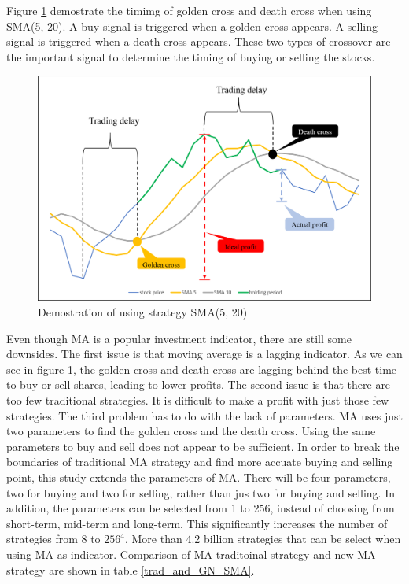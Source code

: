 \documentclass[../main.tex]{subfiles}
\begin{document}
\bigbreak
Figure \ref{cross_demo} demostrate the timimg of golden cross and death cross when using SMA(5, 20). A buy signal is triggered when a golden cross appears. A selling signal is triggered when a death cross appears. These two types of crossover are the important signal to determine the timing of buying or selling the stocks.
\bigbreak

\begin{figure}[ht]
    \centering
    \includegraphics[scale = 0.6] {figure/cross1.png}
    \caption{Demostration of using strategy SMA(5, 20)}
    \label{cross_demo}
\end{figure}

Even though MA is a popular investment indicator, there are still some downsides. The first issue is that moving average is a lagging indicator. As we can see in figure \ref{cross_demo}, the golden cross and death cross are lagging behind the best time to buy or sell shares, leading to lower profits. The second issue is that there are too few traditional strategies. It is difficult to make a profit with just those few strategies. The third problem has to do with the lack of parameters. MA uses just two parameters to find the golden cross and the death cross. Using the same parameters to buy and sell does not appear to be sufficient.
\bigbreak
In order to break the boundaries of traditional MA strategy and find more accuate buying and selling point, this study extends the parameters of MA. There will be four parameters, two for buying and two for selling, rather than jus two for buying and selling. In addition, the parameters can be selected from 1 to 256, instead of choosing from short-term, mid-term and long-term.
This significantly increases the number of strategies from 8 to $\text{256}^\text{4}$. More than 4.2 billion strategies that can be select when using MA as indicator. Comparison of MA traditoinal strategy and new MA strategy are shown in table \ref{trad_and_GN_SMA}.
\bigbreak
\end{document}
